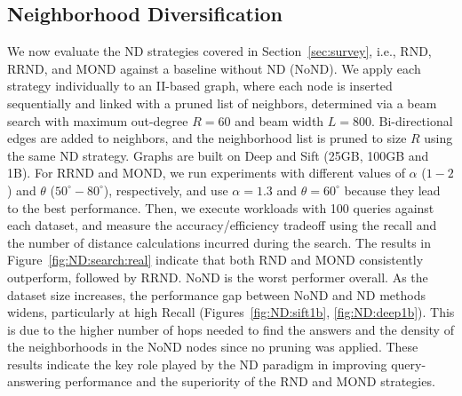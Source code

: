 \subsection{Neighborhood Diversification}
\label{subsec:experiments-ND}
We now evaluate the ND strategies covered in Section~\ref{sec:survey}, i.e., RND, RRND, and MOND against a baseline without ND (NoND). 
We apply each strategy individually to an II-based graph, where each node is inserted sequentially and linked with a pruned list of neighbors, determined via a beam search with maximum out-degree $R=60$ and beam width $L=800$. Bi-directional edges are added to neighbors, and the neighborhood list is pruned to size $R$ using the same ND strategy.
Graphs are built on Deep and Sift (25GB, 100GB and 1B). 
For RRND and MOND, we run experiments with different values of $\alpha$ ($1-2$) and $\theta$ ($50^\circ-80^\circ$), respectively, and use $\alpha = 1.3$ and $\theta = 60^\circ$ because they lead to the best performance. 
Then, we execute workloads with 100 queries against each dataset, and measure the accuracy/efficiency tradeoff using the recall and the number of distance calculations incurred during the search. The results in Figure~\ref{fig:ND:search:real} indicate that both RND and MOND consistently outperform, followed by RRND. NoND is the worst performer overall. As the dataset size increases, the performance gap between NoND and ND methods widens, particularly at high Recall (Figures~\ref{fig:ND:sift1b}, \ref{fig:ND:deep1b}). 
This is due to the higher number of hops needed to find the answers and the density of the neighborhoods in the NoND nodes since no pruning was applied. 
These results indicate the key role played by the ND paradigm in improving query-answering performance and the superiority of the RND and MOND strategies.
\newcommand{\sffive}{0.27\columnwidth}
